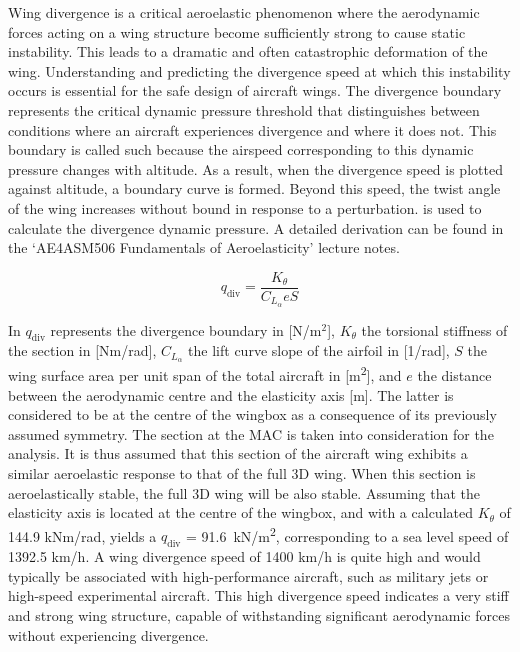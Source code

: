 Wing divergence is a critical aeroelastic phenomenon where the aerodynamic forces acting on a wing structure become sufficiently strong to cause static instability. This leads to a dramatic and often catastrophic deformation of the wing.  Understanding and predicting the divergence speed at which this instability occurs is essential for the safe design of aircraft wings. The divergence boundary represents the critical dynamic pressure threshold that distinguishes between conditions where an aircraft experiences divergence and where it does not. This boundary is called such because the airspeed corresponding to this dynamic pressure changes with altitude. As a result, when the divergence speed is plotted against altitude, a boundary curve is formed. Beyond this speed, the twist angle of the wing increases without bound in response to a perturbation.  is used to calculate the divergence dynamic pressure. A detailed derivation can be found in the \enquote*{AE4ASM506 Fundamentals of Aeroelasticity} lecture notes.


\begin{equation}
    q_\text{div} = \frac{K_\theta}{C_{L_\alpha}eS}
    \label{eq:divergence}
\end{equation}

In  $q_\text{div}$ represents the divergence boundary in [N/m$^2$], $K_\theta$ the torsional stiffness of
the section in [Nm/rad], $C_{L_\alpha}$ the lift curve slope of the airfoil in [1/rad], $S$ the wing
surface area per unit span of the total aircraft in [\unit{m^2}], and $e$ the distance between the aerodynamic centre and the elasticity axis [m]. The latter is considered to be at the centre of the wingbox as a consequence of its previously assumed symmetry. The section at the MAC is taken into consideration for the analysis. It is thus assumed that this section of the aircraft wing exhibits a similar aeroelastic response to that of the full 3D wing. When this section is aeroelastically stable, the full 3D wing will be also stable. Assuming that the elasticity axis is located at the centre of the wingbox, and with a calculated $K_\theta$ of 144.9 kNm/rad,  yields a $q_\text{div}$ = \qty{91.6}{kN/m^2}, corresponding to a sea level speed of 1392.5 km/h. A wing divergence speed of 1400 km/h is quite high and would typically be associated with high-performance aircraft, such as military jets or high-speed experimental aircraft. This high divergence speed indicates a very stiff and strong wing structure, capable of withstanding significant aerodynamic forces without experiencing divergence. 

